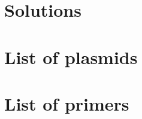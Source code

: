 \appendix
\chapter{Solutions}
  \label{app:solutions}

\chapter{List of plasmids}
  \label{app:plasmids}

\chapter{List of primers}
  \label{app:primers}
